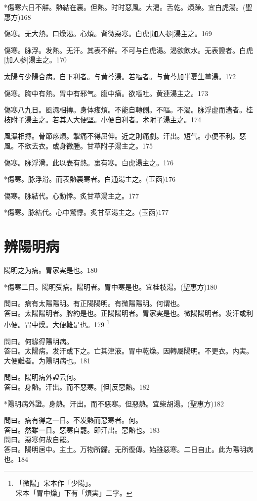 \documentclass[12pt,oneside,UTF8,b5paper]{ctexbook}她她她她她她她
\begin{document}
*傷寒六日不觧。熱結在裏。但熱。时时惡風。大渴。舌乾。煩躁。宜白虎湯。(聖惠方)168

傷寒。无大熱。口燥渴。心煩。背微惡寒。白虎[加人参]湯主之。169

傷寒。脉浮。发熱。无汗。其表不觧。不可与白虎湯。渴欲飲水。无表證者。白虎[加人参]湯主之。170

太陽与少陽合病。自下利者。与黄芩湯。若嘔者。与黄芩加半夏生薑湯。172

傷寒。胸中有熱。胃中有邪气。腹中痛。欲嘔吐。黄連湯主之。173

傷寒八九日。風濕相摶。身体疼煩。不能自轉側。不嘔。不渴。脉浮虚而濇者。桂枝附子湯主之。若其人大便堅。小便自利者。术附子湯主之。174

風濕相摶。骨節疼煩。掣痛不得屈伸。近之則痛劇。汗出。短气。小便不利。惡風。不欲去衣。或身微腫。甘草附子湯主之。175

傷寒。脉浮滑。此以表有熱。裏有寒。白虎湯主之。176

*傷寒。脉浮滑。而表熱裏寒者。白通湯主之。(玉函)176

傷寒。脉結代。心動悸。炙甘草湯主之。177

*傷寒。脉結代。心中驚悸。炙甘草湯主之。(玉函)177

\chapter{辨陽明病}

陽明之为病。胃家実是也。180

*傷寒二日。陽明受病。陽明者。胃中寒是也。宜桂枝湯。(聖惠方)180

問曰。病有太陽陽明。有正陽陽明。有微陽陽明。何谓也。\\
答曰。太陽陽明者。脾約是也。正陽陽明者。胃家実是也。微陽陽明者。发汗或利小便。胃中燥。大便難是也。179
	\footnote{「微陽」宋本作「少陽」。\\宋本「胃中燥」下有「煩実」二字。}

問曰。何緣得陽明病。\\
答曰。太陽病。发汗或下之。亡其津液。胃中乾燥。因轉屬陽明。不更衣。内実。大便難者。为陽明病也。181

問曰。陽明病外證云何。\\
答曰。身熱。汗出。而不惡寒。[但]反惡熱。182

*陽明病外證。身熱。汗出。而不惡寒。但惡熱。宜柴胡湯。(聖惠方)182

問曰。病有得之一日。不发熱而惡寒者。何。\\
答曰。然雖一日。惡寒自罷。即汗出。惡熱也。183\\
問曰。惡寒何故自罷。\\
答曰。陽明居中。主土。万物所歸。无所復傳。始雖惡寒。二日自止。此为陽明病也。184
\end{document}
